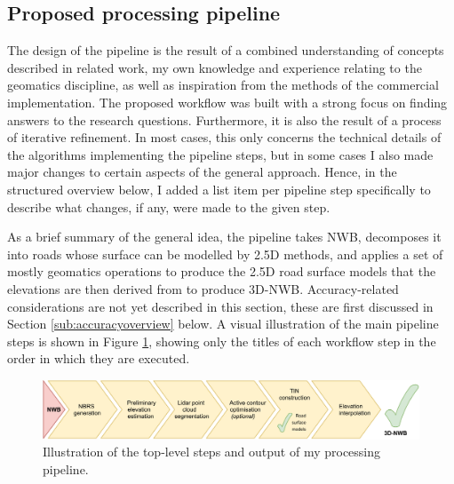 \subsection{Proposed processing pipeline}
\label{sub:pipelineoverview}

The design of the pipeline is the result of a combined understanding of concepts described in related work, my own knowledge and experience relating to the geomatics discipline, as well as inspiration from the methods of the commercial implementation. The proposed workflow was built with a strong focus on finding answers to the research questions. Furthermore, it is also the result of a process of iterative refinement. In most cases, this only concerns the technical details of the algorithms implementing the pipeline steps, but in some cases I also made major changes to certain aspects of the general approach. Hence, in the structured overview below, I added a list item per pipeline step specifically to describe what changes, if any, were made to the given step.

As a brief summary of the general idea, the pipeline takes NWB, decomposes it into roads whose surface can be modelled by 2.5D methods, and applies a set of mostly geomatics operations to produce the 2.5D road surface models that the elevations are then derived from to produce 3D-NWB. Accuracy-related considerations are not yet described in this section, these are first discussed in Section \ref{sub:accuracyoverview} below. A visual illustration of the main pipeline steps is shown in Figure \ref{fig:workflow}, showing only the titles of each workflow step in the order in which they are executed.

\begin{figure}
    \centering
    \includegraphics[width=0.9\linewidth]{final_report/figs/workflow_steps.pdf}
    \caption{Illustration of the top-level steps and output of my processing pipeline.}
    \label{fig:workflow}
\end{figure}

